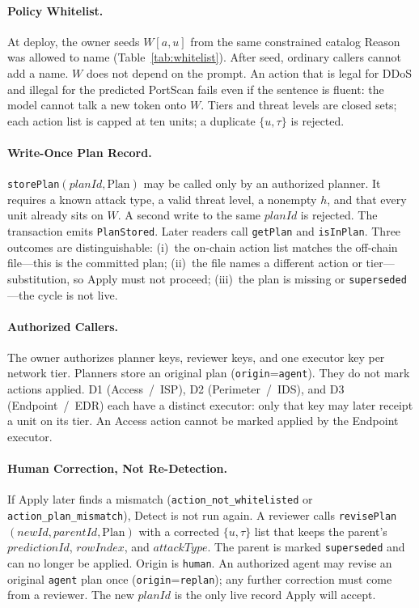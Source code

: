 \documentclass[10pt, conference]{IEEEtran}
\begin{document}
\paragraph{Policy Whitelist.}
At deploy, the owner seeds $W[a,u]$ from the same constrained catalog Reason was allowed to name (Table~\ref{tab:whitelist}). After seed, ordinary callers cannot add a name. $W$ does not depend on the prompt. An action that is legal for DDoS and illegal for the predicted PortScan fails even if the sentence is fluent: the model cannot talk a new token onto $W$. Tiers and threat levels are closed sets; each action list is capped at ten units; a duplicate $\{u,\tau\}$ is rejected.

\paragraph{Write-Once Plan Record.}
\texttt{storePlan}$(\mathit{planId},\mathrm{Plan})$ may be called only by an authorized planner. It requires a known attack type, a valid threat level, a nonempty $h$, and that every unit already sits on $W$. A second write to the same $\mathit{planId}$ is rejected. The transaction emits \texttt{PlanStored}. Later readers call \texttt{getPlan} and \texttt{isInPlan}. Three outcomes are distinguishable: (i)~the on-chain action list matches the off-chain file---this is the committed plan; (ii)~the file names a different action or tier---substitution, so Apply must not proceed; (iii)~the plan is missing or \texttt{superseded}---the cycle is not live.

\paragraph{Authorized Callers.}
The owner authorizes planner keys, reviewer keys, and one executor key per network tier. Planners store an original plan (\texttt{origin}=\texttt{agent}). They do not mark actions applied. D1 (Access~/~ISP), D2 (Perimeter~/~IDS), and D3 (Endpoint~/~EDR) each have a distinct executor: only that key may later receipt a unit on its tier. An Access action cannot be marked applied by the Endpoint executor.

\paragraph{Human Correction, Not Re-Detection.}
If Apply later finds a mismatch (\texttt{action\_not\_whitelisted} or \texttt{action\_plan\_mismatch}), Detect is not run again. A reviewer calls \texttt{revisePlan}$(\mathit{newId},\mathit{parentId},\mathrm{Plan})$ with a corrected $\{u,\tau\}$ list that keeps the parent's $\mathit{predictionId}$, $\mathit{rowIndex}$, and $\mathit{attackType}$. The parent is marked \texttt{superseded} and can no longer be applied. Origin is \texttt{human}. An authorized agent may revise an original \texttt{agent} plan once (\texttt{origin}=\texttt{replan}); any further correction must come from a reviewer. The new $\mathit{planId}$ is the only live record Apply will accept.
\end{document}
